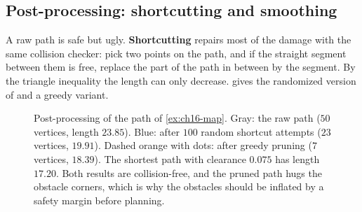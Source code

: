 \subsection{Post-processing: shortcutting and smoothing}
\label{sec:ch16-smoothing}


A raw \rrt path is safe but ugly. \textbf{Shortcutting}
repairs most of the damage with the same collision checker: pick two points
on the path, and if the straight segment between them is free, replace the
part of the path in between by the segment. By the triangle inequality the
length can only decrease.  gives the randomized
version of \textcite{geraerts2007creating} and a greedy variant.

\begin{algorithm}[!htb]
\caption{Path post-processing: random shortcutting and greedy pruning}
\label{alg:ch16-shortcut}
\end{algorithm}


\begin{figure}[tb]
  \centering
  \caption{Post-processing of the path of \cref{ex:ch16-map}. Gray: the raw
  \rrt path ($50$ vertices, length $23.85$). Blue: after $100$ random
  shortcut attempts ($23$ vertices, $19.91$). Dashed orange with dots: after
  greedy pruning ($7$ vertices, $18.39$). The shortest path with clearance
  $0.075$ has length $17.20$. Both results are collision-free, and the pruned
  path hugs the obstacle corners, which is why the obstacles should be
  inflated by a safety margin before planning.}
  \label{fig:ch16-shortcut}
\end{figure}

